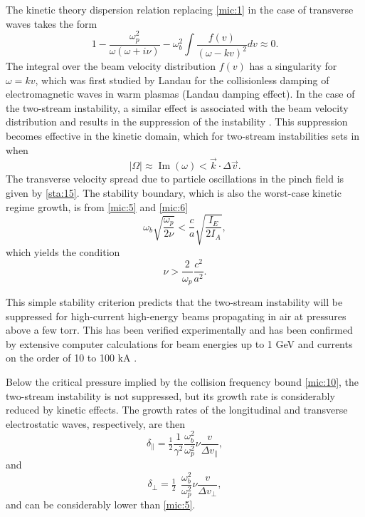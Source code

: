 \documentclass [12pt,a4paper,     ]{report} %
\newcommand{\IMA}{\operatorname{Im}}  %
\newcommand{\Oh}{\tfrac{1}{2}}        %
\begin{document}
	The kinetic theory dispersion relation replacing \eqref{mic:1} in the case of transverse waves takes the form \cite{BRIGG1971-} 
%
\begin{equation}\label{mic:7} %
   1 - \frac{\omega_p^2}{\omega(\omega+i\nu)}
     - \omega_b^2 \int \frac{f(v)}{(\omega-kv)^2}dv
     \approx 0.
\end{equation}
%
The integral over the beam velocity distribution $f(v)$ has a singularity for $\omega = kv$, which was first studied by Landau for the collisionless damping of electromagnetic waves in warm plasmas (Landau damping effect).  In the case of the two-stream instability, a similar effect is associated with the beam velocity distribution and results in the suppression of the instability \cite{SINGH1964-}.  This suppression becomes effective in the kinetic domain, which for two-stream instabilities sets in when
%
\begin{equation}\label{mic:8} %
      |\Omega| \approx \IMA(\omega) < \vec{k} \cdot \Delta\vec{v}.
\end{equation}
%
The transverse velocity spread due to particle oscillations in the pinch field is given by \eqref{sta:15}.  The stability boundary, which is also the worst-case kinetic regime growth, is from \eqref{mic:5} and \eqref{mic:6}
%
\begin{equation}\label{mic:9} %
                \omega_b    \sqrt{ \frac{\omega_p}{2\nu} }
              < \frac{c}{a} \sqrt{ \frac{I_E}{2I_A} },
\end{equation}
%
which yields the condition \cite{LEE--1977B}
%
\begin{equation}\label{mic:10} %
          \nu  >  \frac{2}{\omega_p}   \frac{c^2}{a^2}.
\end{equation}
%

	This simple stability criterion predicts that the two-stream instability will be suppressed for high-current high-energy beams propagating in air at pressures above a few torr.  This has been verified experimentally \cite{BRIGG1977-,RUDAK1972-} and has been confirmed by extensive computer calculations for beam energies up to 1 GeV and currents on the order of 10 to 100 kA \cite{NEWBE1982-}.

	Below the critical pressure implied by the collision frequency bound \eqref{mic:10}, the two-stream instability is not suppressed, but its growth rate is considerably reduced by kinetic effects.  The growth rates of the longitudinal and transverse electrostatic waves, respectively, are then  \cite{THODE1976-,GRISH1973-}
%
\begin{equation}\label{mic:11} %
    \delta_{\|} = \Oh \frac{1}{\gamma^2}
                       \frac{\omega_b^2}{\omega_p^2}
                   \nu \frac{v}{\Delta v_{\|}},
\end{equation}
%
and
%
\begin{equation}\label{mic:12} %
    \delta_{\perp} = \Oh ~~
                       \frac{\omega_b^2}{\omega_p^2}
                   \nu \frac{v}{\Delta v_{\perp}},
\end{equation}
%
and can be considerably lower than \eqref{mic:5}.
\end{document}
